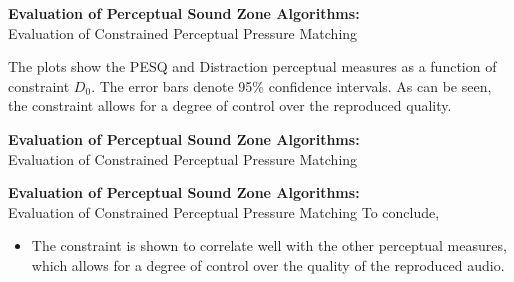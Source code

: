 \documentclass[aspectratio=169]{beamer}
\begin{document}
\begin{frame}{\textbf{Evaluation of Perceptual Sound Zone Algorithms:}\\ Evaluation of Constrained
    Perceptual Pressure Matching}
    \begin{figure}[]
        \centering
        \scalebox{0.75}{}
    \end{figure}
    The plots show the PESQ and Distraction perceptual measures as a function of constraint $D_0$. 
    The error bars denote 95\% confidence intervals.
    As can be seen, the constraint allows for a degree of control over the reproduced quality.
\end{frame}

\begin{frame}{\textbf{Evaluation of Perceptual Sound Zone Algorithms:}\\ Evaluation of Constrained
    Perceptual Pressure Matching}
    \begin{figure}[]
        \centering
        \scalebox{0.55}{}
    \end{figure}
\end{frame}

\begin{frame}{\textbf{Evaluation of Perceptual Sound Zone Algorithms:}\\ Evaluation of Constrained
    Perceptual Pressure Matching}
    To conclude, 
    \begin{itemize}
        \item The constraint is shown to correlate well with the other perceptual measures, which allows for a degree of control over the 
            quality of the reproduced audio.
    \end{itemize}
\end{frame}
\end{document}
